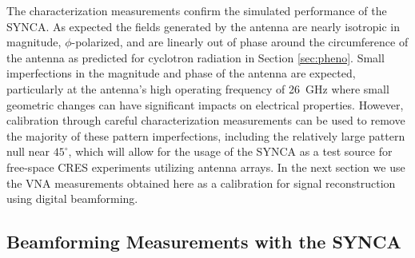 The characterization measurements confirm the simulated performance of the SYNCA. As expected the fields generated by the antenna are nearly isotropic in magnitude, $\phi$-polarized, and are linearly out of phase around the circumference of the antenna as predicted for cyclotron radiation in Section \ref{sec:pheno}. Small imperfections in the magnitude and phase of the antenna are expected, particularly at the antenna's high operating frequency of 26~GHz where small geometric changes can have significant impacts on electrical properties. However, calibration through careful characterization measurements can be used to remove the majority of these pattern imperfections, including the relatively large pattern null near $45^\circ$, which will allow for the usage of the SYNCA as a test source for free-space CRES experiments utilizing antenna arrays. In the next section we use the VNA measurements obtained here as a calibration for signal reconstruction using digital beamforming.


\subsection{Beamforming Measurements with the SYNCA}
\label{sec:synca-beamforming-meas}

